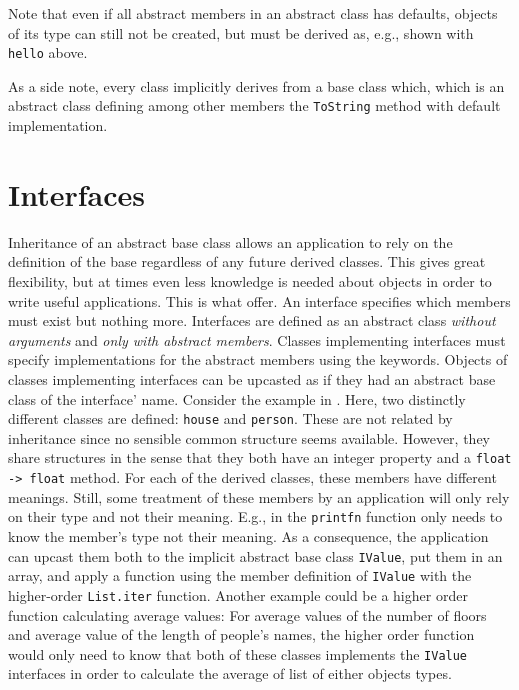 Note that even if all abstract members in an abstract class has defaults, objects of its type can still not be created, but must be derived as, e.g., shown with \lstinline{hello} above.

As a side note, every class implicitly derives from a base class  which, which is an abstract class defining among other members the \lstinline{ToString} method with default implementation.

\section{Interfaces}
\label{sec:interfaces}
Inheritance of an abstract base class allows an application to rely on the definition of the base regardless of any future derived classes. This gives great flexibility, but at times even less knowledge is needed about objects in order to write useful applications. This is what  offer. An interface specifies which members must exist but nothing more. Interfaces are defined as an abstract class \emph{without arguments} and \emph{only with abstract members}. Classes implementing interfaces must specify implementations for the abstract members using the  keywords. Objects of classes implementing interfaces can be upcasted as if they had an abstract base class of the interface' name. Consider the example in .
%
%
Here, two distinctly different classes are defined: \lstinline{house} and \lstinline{person}. These are not related by inheritance since no sensible common structure seems available. However, they share structures in the sense that they both have an integer property and a \lstinline{float -> float} method. For each of the derived classes, these members have different meanings. Still, some treatment of these members by an application will only rely on their type and not their meaning. E.g., in  the \lstinline{printfn} function only needs to know the member's type not their meaning. As a consequence, the application can upcast them both to the implicit abstract base class \lstinline{IValue}, put them in an array, and apply a function using the member definition of \lstinline{IValue} with the higher-order \lstinline{List.iter} function. Another example could be a higher order function calculating average values: For average values of the number of floors and average value of the length of people's names, the higher order function would only need to know that both of these classes implements the \lstinline{IValue} interfaces in order to calculate the average of list of either objects types.

